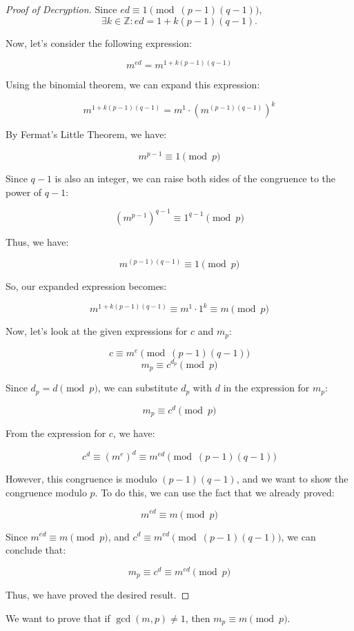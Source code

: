 \documentclass{article}
\theoremstyle{definition}
\newcommand{\Z}{\mathbb{Z}}
\begin{document}
\begin{proof}[Proof of Decryption]
	Since $ed \equiv 1 \pmod{(p-1)(q-1)}$, \[
	\exists k\in\Z:ed = 1 + k(p-1)(q-1).
	\]
	
	Now, let's consider the following expression:
	
	$$m^{ed} = m^{1 + k(p-1)(q-1)}$$
	
	Using the binomial theorem, we can expand this expression:
	
	$$m^{1 + k(p-1)(q-1)} = m^1 \cdot (m^{(p-1)(q-1)})^k$$
	
	By Fermat's Little Theorem, we have:
	
	$$m^{p-1} \equiv 1 \pmod{p}$$
	
	Since $q-1$ is also an integer, we can raise both sides of the congruence to the power of $q-1$:
	
	$$(m^{p-1})^{q-1} \equiv 1^{q-1} \pmod{p}$$
	
	Thus, we have:
	
	$$m^{(p-1)(q-1)} \equiv 1 \pmod{p}$$
	
	So, our expanded expression becomes:
	
	$$m^{1 + k(p-1)(q-1)} \equiv m^1 \cdot 1^k \equiv m \pmod{p}$$
	
	Now, let's look at the given expressions for $c$ and $m_p$:
	
	$$c \equiv m^e \pmod{(p-1)(q-1)}$$
	$$m_p \equiv c^{d_p} \pmod{p}$$
	
	Since $d_p = d \pmod p$, we can substitute $d_p$ with $d$ in the expression for $m_p$:
	
	$$m_p \equiv c^d \pmod{p}$$
	
	From the expression for $c$, we have:
	
	$$c^d \equiv (m^e)^d \equiv m^{ed} \pmod{(p-1)(q-1)}$$
	
	However, this congruence is modulo $(p-1)(q-1)$, and we want to show the congruence modulo $p$. To do this, we can use the fact that we already proved:
	
	$$m^{ed} \equiv m \pmod{p}$$
	
	Since $m^{ed} \equiv m \pmod{p}$, and $c^d \equiv m^{ed} \pmod{(p-1)(q-1)}$, we can conclude that:
	
	$$m_p \equiv c^d \equiv m^{ed} \pmod{p}$$
	
	Thus, we have proved the desired result.
\end{proof}

We want to prove that if $\gcd(m, p) \neq 1$, then $m_p \equiv m \pmod{p}$.
\end{document}
